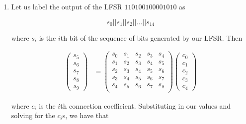 \begin{enumerate}

\item Let us label the output of the LFSR $110100100001010$ as

\[s_0 || s_1 || s_2 || ... || s_{14} \]

where $s_i$ is the $i$th bit of the sequence of bits generated by our LFSR. Then

\begin{align*}
\begin{pmatrix}
s_5 \\ s_6 \\ s_7 \\ s_8 \\ s_9 
\end{pmatrix}
&= 
\begin{pmatrix}
s_0 & s_1 & s_2 & s_3 & s_4 \\
s_1 & s_2 & s_3 & s_4 & s_5 \\
s_2 & s_3 & s_4 & s_5 & s_6 \\
s_3 & s_4 & s_5 & s_6 & s_7 \\
s_4 & s_5 & s_6 & s_7 & s_8 \\
\end{pmatrix} 
\begin{pmatrix}
c_0 \\ c_1 \\ c_2 \\ c_3 \\ c_4
\end{pmatrix} 
\end{align*}

where $c_i$ is the $i$th connection coefficient. Substituting in our values and
solving for the $c_i$s, we have that


\end{enumerate}
